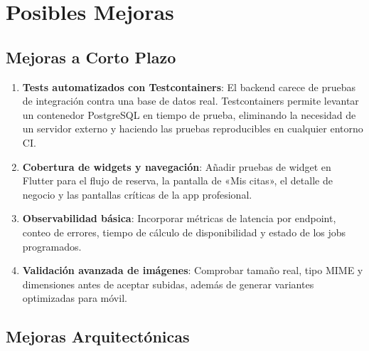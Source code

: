 \documentclass[12pt,a4paper,twoside]{report}
\begin{document}
\section{Posibles Mejoras}

\subsection{Mejoras a Corto Plazo}

\begin{enumerate}
  \item \textbf{Tests automatizados con Testcontainers}: El backend carece de pruebas de integración contra una base de datos real. Testcontainers permite levantar un contenedor PostgreSQL en tiempo de prueba, eliminando la necesidad de un servidor externo y haciendo las pruebas reproducibles en cualquier entorno CI.

  \item \textbf{Cobertura de widgets y navegación}: Añadir pruebas de widget en Flutter para el flujo de reserva, la pantalla de «Mis citas», el detalle de negocio y las pantallas críticas de la app profesional.

  \item \textbf{Observabilidad básica}: Incorporar métricas de latencia por endpoint, conteo de errores, tiempo de cálculo de disponibilidad y estado de los jobs programados.

  \item \textbf{Validación avanzada de imágenes}: Comprobar tamaño real, tipo MIME y dimensiones antes de aceptar subidas, además de generar variantes optimizadas para móvil.
\end{enumerate}

\subsection{Mejoras Arquitectónicas}
\end{document}
